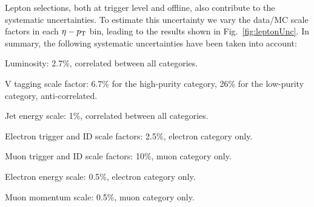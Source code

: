 Lepton selections, both at trigger level and offline, also contribute to the systematic uncertainties. To estimate this uncertainty we vary the data/MC scale factors in each $\eta-p_{\rm T}$ bin, leading to the results shown in Fig.~\ref{fig:leptonUnc}. In summary, the following systematic uncertainties have been taken into account:

\begin{compact_itemize}
\item Luminosity: 2.7\%, correlated between all categories.
\item V tagging scale factor: 6.7\% for the high-purity category, 26\% for the low-purity category, anti-correlated.
\item Jet energy scale: 1\%, correlated between all categories.
\item Electron trigger and ID scale factors: 2.5\%, electron category only.
\item Muon trigger and ID scale factors: 10\%, muon category only.
\item Electron energy scale: 0.5\%, electron category only.
\item Muon momentum scale: 0.5\%, muon category only.
\end{compact_itemize} 
